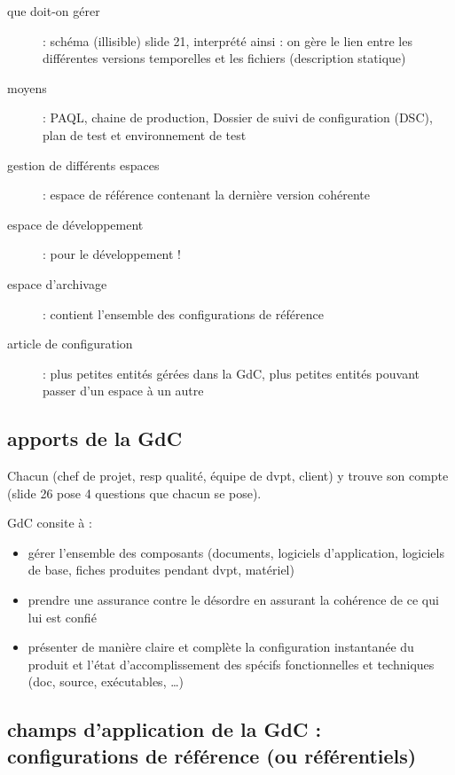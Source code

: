 	\begin{description}
		\item[que doit-on gérer] : schéma (illisible) slide 21, interprété ainsi : on gère le lien entre les différentes versions temporelles et les fichiers (description statique)
		\item[moyens] : PAQL, chaine de production, Dossier de suivi de configuration (DSC), plan de test et environnement de test
	\end{description}

	\begin{description}
		\item[gestion de différents espaces] : espace de référence contenant la dernière version cohérente
		\item[espace de développement] : pour le développement !
		\item[espace d’archivage] : contient l’ensemble des configurations de référence
	\end{description}

	\begin{description}
		\item[article de configuration] : plus petites entités gérées dans la GdC, plus petites entités pouvant passer d’un espace à un autre
	\end{description}


	\subsection{apports de la GdC}

	Chacun (chef de projet, resp qualité, équipe de dvpt, client) y trouve son compte (slide 26 pose 4 questions que chacun se pose).

	GdC consite à :

	\begin{itemize}
		\item  gérer l’ensemble des composants (documents, logiciels d’application, logiciels de base, fiches produites pendant dvpt, matériel)
		\item prendre une assurance contre le désordre en assurant la cohérence de ce qui lui est confié
		\item présenter de manière claire et complète la configuration instantanée du produit et l’état d’accomplissement des spécifs fonctionnelles et techniques (doc, source, exécutables, \ldots)
	\end{itemize}

	\subsection{champs d’application de la GdC : configurations de référence (ou référentiels)}

